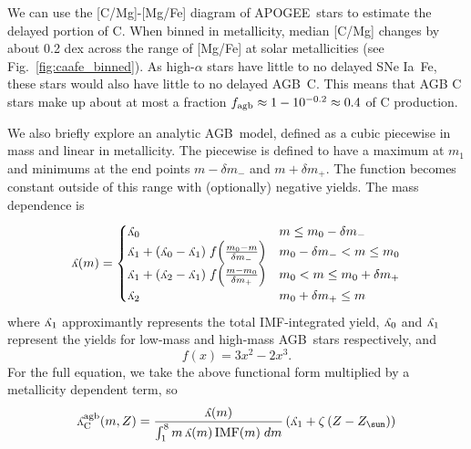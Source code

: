 \documentclass[fleqn,usenatbib]{mnras}
\newcommand{\agb}{AGB}
\newcommand{\apogee}{APOGEE}
\newcommand{\ia}{SNe Ia}
\newcommand{\imf}{IMF}
\newcommand{\caafe}{[C/Mg]-[Mg/Fe]}
\newcommand{\y}{\ensuremath{\rotatebox[origin=B,y=0.5ex]{180}{y}}}
\newcommand{\Zo}{%
    \ifmmode Z_{\sun}%
    \else $Z_{\sun}$%
    \fi}
\begin{document}
We can use the \caafe{} diagram of \apogee\ stars to estimate the delayed portion of C. When binned in metallicity, median [C/Mg] changes by about 0.2 dex across the range of [Mg/Fe] at solar metallicities (see Fig.~\ref{fig:caafe_binned}). As high-$\alpha$ stars have little to no delayed \ia\ Fe, these stars would also have little to no delayed \agb\ C. This means that AGB C stars make up about at most a fraction $f_{\rm agb} \approx 1 - 10^{-0.2} \approx 0.4$ of C production.

We also briefly explore an analytic \agb\ model, defined as a cubic piecewise in mass and linear in metallicity.
The piecewise is defined to have a maximum at $m_1$ and minimums at
the end points $m-\delta m_-$ and $m+\delta m_+$. The function becomes constant
outside of this range with (optionally) negative yields.
The mass dependence is
\begin{equation} \label{eq:yca_m}
\y(m) = 
\begin{cases}
\y_0 & m \leq m_0 - \delta m_- \\
\y_1 + (\y_0 - \y_1)\; f\!\left(\frac{m_0 - m}{\delta m_-}\right) 
    & m_0 - \delta m_- < m \leq m_0 \\
    \y_1 + (\y_2 - \y_1)\; f\!\left(\frac{m - m_0}{\delta m_+}\right)
    & m_0 < m \leq m_0 + \delta m_+ \\
\y_2 & m_0 + \delta m_+ \leq m
\end{cases}
\end{equation}
where $\y_1$ approximantly represents the total \imf-integrated yield, $\y_0$ and $\y_1$ represent the yields for low-mass and high-mass \agb\ stars respectively, and 
\begin{equation}
    f(x) = 3x^2 - 2x^3.
\end{equation}
For the full equation, we take the above functional form multiplied by a
metallicity dependent term, so 
\begin{equation} \label{eq:yca_z}
    \y_{\rm C}^{\rm agb}(m, Z) = \frac{\y(m)}{\int_1^8 m\,\y(m)\,{\rm IMF}(m)\;dm} 
    \left(\y_1 + \zeta \left(Z-\Zo\right) \right)
\end{equation}
\end{document}
